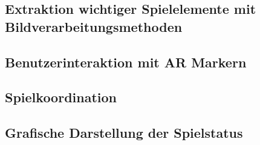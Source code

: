 \subsection{Extraktion wichtiger Spielelemente mit Bildverarbeitungsmethoden} %

\subsection{Benutzerinteraktion mit AR Markern} %

\subsection{Spielkoordination} %

\subsection{Grafische Darstellung der Spielstatus} %
